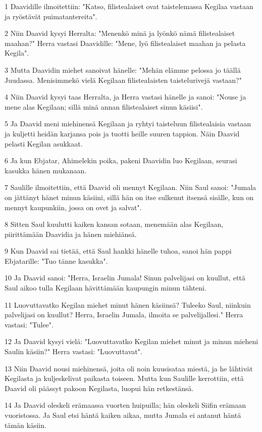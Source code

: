\par 1 Daavidille ilmoitettiin: "Katso, filistealaiset ovat taistelemassa Kegilaa vastaan ja ryöstävät puimatantereita".
\par 2 Niin Daavid kysyi Herralta: "Menenkö minä ja lyönkö nämä filistealaiset maahan?" Herra vastasi Daavidille: "Mene, lyö filistealaiset maahan ja pelasta Kegila".
\par 3 Mutta Daavidin miehet sanoivat hänelle: "Mehän elämme pelossa jo täällä Juudassa. Menisimmekö vielä Kegilaan filistealaisten taistelurivejä vastaan?"
\par 4 Niin Daavid kysyi taas Herralta, ja Herra vastasi hänelle ja sanoi: "Nouse ja mene alas Kegilaan; sillä minä annan filistealaiset sinun käsiisi".
\par 5 Ja Daavid meni miehinensä Kegilaan ja ryhtyi taisteluun filistealaisia vastaan ja kuljetti heidän karjansa pois ja tuotti heille suuren tappion. Näin Daavid pelasti Kegilan asukkaat.
\par 6 Ja kun Ebjatar, Ahimelekin poika, pakeni Daavidin luo Kegilaan, seurasi kasukka hänen mukanaan.
\par 7 Saulille ilmoitettiin, että Daavid oli mennyt Kegilaan. Niin Saul sanoi: "Jumala on jättänyt hänet minun käsiini, sillä hän on itse sulkenut itsensä sisälle, kun on mennyt kaupunkiin, jossa on ovet ja salvat".
\par 8 Sitten Saul kuulutti kaiken kansan sotaan, menemään alas Kegilaan, piirittämään Daavidia ja hänen miehiänsä.
\par 9 Kun Daavid sai tietää, että Saul hankki hänelle tuhoa, sanoi hän pappi Ebjatarille: "Tuo tänne kasukka".
\par 10 Ja Daavid sanoi: "Herra, Israelin Jumala! Sinun palvelijasi on kuullut, että Saul aikoo tulla Kegilaan hävittämään kaupungin minun tähteni.
\par 11 Luovuttavatko Kegilan miehet minut hänen käsiinsä? Tuleeko Saul, niinkuin palvelijasi on kuullut? Herra, Israelin Jumala, ilmoita se palvelijallesi." Herra vastasi: "Tulee".
\par 12 Ja Daavid kysyi vielä: "Luovuttavatko Kegilan miehet minut ja minun mieheni Saulin käsiin?" Herra vastasi: "Luovuttavat".
\par 13 Niin Daavid nousi miehinensä, joita oli noin kuusisataa miestä, ja he lähtivät Kegilasta ja kuljeskelivat paikasta toiseen. Mutta kun Saulille kerrottiin, että Daavid oli päässyt pakoon Kegilasta, luopui hän retkestänsä.
\par 14 Ja Daavid oleskeli erämaassa vuorten huipuilla; hän oleskeli Siifin erämaan vuoristossa. Ja Saul etsi häntä kaiken aikaa, mutta Jumala ei antanut häntä tämän käsiin.

